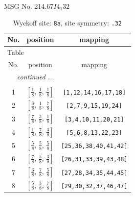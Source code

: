 \documentclass[fleqn,8pt]{jsarticle}
\begin{document}
\setcounter{MaxMatrixCols}{32}

\renewcommand{\tablename}{Table~}
\renewcommand{\figurename}{Figure~}
\begin{center}
\LARGE
MSG No. 214.67\quad$I4_{1}32$
\end{center}
\renewcommand{\arraystretch}{1.2}
\begin{longtable}{ccc}
\caption{Wyckoff site: {\tt 8a}, site symmetry: {\tt .32}}
 \\
 \hline \hline
No. & position & mapping \\ \hline \endfirsthead

\multicolumn{2}{l}{\tablename\ \thetable{}} \\
 \hline \hline
No. & position & mapping \\ \hline \endhead

 \hline \hline
\multicolumn{2}{r}{\footnotesize\it continued ...} \\ \endfoot

 \hline \hline
\multicolumn{2}{r}{} \\ \endlastfoot

1 & $\left[ \frac{1}{8},\, \frac{1}{8},\, \frac{1}{8} \right]$ & {\tt [1,12,14,16,17,18]} \\ \hline
2 & $\left[ \frac{3}{8},\, \frac{1}{8},\, \frac{7}{8} \right]$ & {\tt [2,7,9,15,19,24]} \\ \hline
3 & $\left[ \frac{7}{8},\, \frac{3}{8},\, \frac{1}{8} \right]$ & {\tt [3,4,10,11,20,21]} \\ \hline
4 & $\left[ \frac{1}{8},\, \frac{7}{8},\, \frac{3}{8} \right]$ & {\tt [5,6,8,13,22,23]} \\ \hline
5 & $\left[ \frac{5}{8},\, \frac{5}{8},\, \frac{5}{8} \right]$ & {\tt [25,36,38,40,41,42]} \\ \hline
6 & $\left[ \frac{7}{8},\, \frac{5}{8},\, \frac{3}{8} \right]$ & {\tt [26,31,33,39,43,48]} \\ \hline
7 & $\left[ \frac{3}{8},\, \frac{7}{8},\, \frac{5}{8} \right]$ & {\tt [27,28,34,35,44,45]} \\ \hline
8 & $\left[ \frac{5}{8},\, \frac{3}{8},\, \frac{7}{8} \right]$ & {\tt [29,30,32,37,46,47]} \\
\end{longtable}
\renewcommand{\arraystretch}{1.2}
\end{document}
